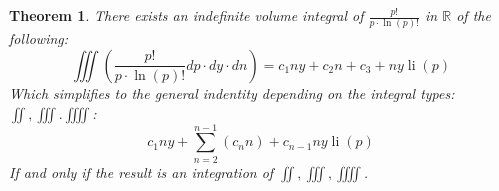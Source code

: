 \documentclass[11pt, a4paper]{article}
\theoremstyle{plain}
\newtheorem{theorem}{Theorem}[section]
\theoremstyle{definition}
\theoremstyle{remark}
\begin{document}
\begin{theorem}
  There exists an indefinite volume integral of $\frac{p!}{p \cdot \ln \left(p\right)!}$ in $\mathbb{R}$ of the following:
  \begin{equation}
    \iiint (\frac{p!}{p \cdot \ln \left(p\right)!} dp \cdot dy \cdot dn )= c_{1} n y + c_{2} n + c_{3} + n y \operatorname{li}(p)
  \end{equation}
  Which simplifies to the general indentity depending on the integral types: $\iint, \iiint. \iiiint$:
  \begin{equation}
    c_{1} n y + \sum_{n=2}^{n-1} ( c_{n} n ) + c_{n-1} n y \operatorname{li}(p)
  \end{equation}
  If and only if the result is an integration of $\iint, \iiint, \iiiint$.
\end{theorem}
\end{document}
